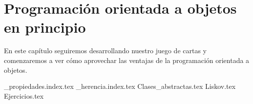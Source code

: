 \chapter{Programación orientada a objetos en principio}
  \label{chap:oop2}
  
  En este capítulo seguiremos desarrollando nuestro juego de cartas y comenzaremos a ver cómo
  aprovechar las ventajas de la programación orientada a objetos.

  {_propiedades.index.tex}
  {_herencia.index.tex}
  {Clases_abstractas.tex}
  {Liskov.tex}
  {Ejercicios.tex}
  \printbibliography[keyword=oop2]
